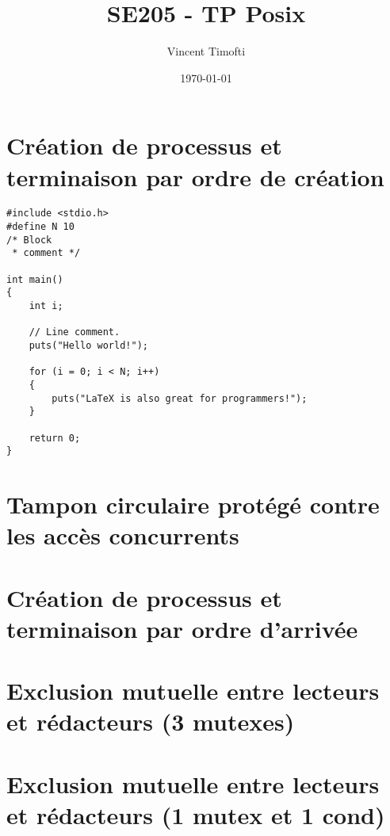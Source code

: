 \documentclass[12pt]{article}
\begin{document}
\lstset{
  language=C
}

\title{SE205 - TP Posix}
\author{Vincent Timofti}
\date{\today}
\maketitle

\tableofcontents

\section{Création de processus et terminaison par ordre de création}

\begin{lstlisting}
#include <stdio.h>
#define N 10
/* Block
 * comment */

int main()
{
    int i;

    // Line comment.
    puts("Hello world!");
    
    for (i = 0; i < N; i++)
    {
        puts("LaTeX is also great for programmers!");
    }

    return 0;
}
\end{lstlisting}

\section{Tampon circulaire protégé contre les accès concurrents}

\section{Création de processus et terminaison par ordre d’arrivée}

\section{Exclusion mutuelle entre lecteurs et rédacteurs (3 mutexes)}

\section{Exclusion mutuelle entre lecteurs et rédacteurs (1 mutex et 1 cond)}
\end{document}
